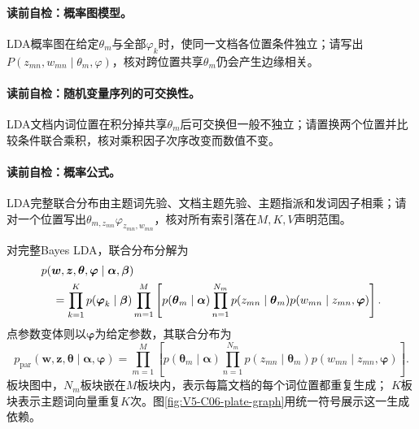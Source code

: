 \paragraph{读前自检：概率图模型。}LDA概率图在给定$\theta_m$与全部$\varphi_k$时，使同一文档各位置条件独立；请写出$P(z_{mn},w_{mn}\mid\theta_m,\varphi)$，核对跨位置共享$\theta_m$仍会产生边缘相关。\par
\paragraph{读前自检：随机变量序列的可交换性。}LDA文档内词位置在积分掉共享$\theta_m$后可交换但一般不独立；请置换两个位置并比较条件联合乘积，核对乘积因子次序改变而数值不变。\par
\paragraph{读前自检：概率公式。}LDA完整联合分布由主题词先验、文档主题先验、主题指派和发词因子相乘；请对一个位置写出$\theta_{m,z_{mn}}\varphi_{z_{mn},w_{mn}}$，核对所有索引落在$M,K,V$声明范围。\par


\label{struct:V5-C06-CH08}
对完整Bayes LDA，联合分布分解为
\begin{align}
&p(\boldsymbol w,\boldsymbol z,\boldsymbol\theta,
\boldsymbol\varphi\mid\boldsymbol\alpha,\boldsymbol\beta)
\label{eq:V5-C06-joint}\\
&\quad=
\prod_{k=1}^{K}p(\boldsymbol\varphi_k\mid\boldsymbol\beta)
\prod_{m=1}^{M}\left[
p(\boldsymbol\theta_m\mid\boldsymbol\alpha)
\prod_{n=1}^{N_m}
p(z_{mn}\mid\boldsymbol\theta_m)
p(w_{mn}\mid z_{mn},\boldsymbol\varphi)
\right].\notag
\end{align}
点参数变体则以$\boldsymbol\varphi$为给定参数，其联合分布为
\begin{equation}
p_{\mathrm{par}}(\boldsymbol w,\boldsymbol z,\boldsymbol\theta
\mid\boldsymbol\alpha,\boldsymbol\varphi)
=\prod_{m=1}^{M}\left[
p(\boldsymbol\theta_m\mid\boldsymbol\alpha)
\prod_{n=1}^{N_m}p(z_{mn}\mid\boldsymbol\theta_m)
p(w_{mn}\mid z_{mn},\boldsymbol\varphi)
\right].
\label{eq:V5-C06-parameterized-joint}
\end{equation}
板块图中，$N_m$板块嵌在$M$板块内，表示每篇文档的每个词位置都重复生成；
$K$板块表示主题词向量重复$K$次。图\ref{fig:V5-C06-plate-graph}用统一符号展示这一生成依赖。



